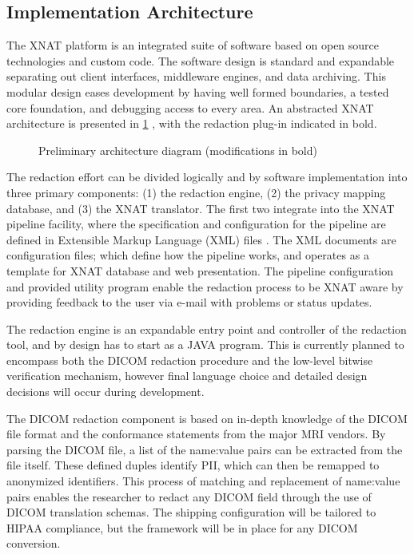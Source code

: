 \subsection*{Implementation Architecture}

The XNAT platform is an integrated suite of software based on open source technologies and custom code. The software design is standard and expandable separating out client interfaces, middleware engines, and data archiving. This modular design eases development by having well formed boundaries, a tested core foundation, and debugging access to every area. An abstracted XNAT architecture is presented in \ref{fig:architecture} \cite{xnat}, with the redaction plug-in indicated in bold.

\begin{figure}[hbt]
        \caption{\label{fig:architecture} Preliminary architecture diagram (modifications in bold)}
\end{figure}

The redaction effort can be divided logically and by software implementation into three primary components: (1) the redaction engine, (2) the privacy mapping database, and (3) the XNAT translator. The first two integrate into the XNAT pipeline facility\cite{xnatpipeline}, where the specification and configuration for the pipeline are defined in Extensible Markup Language (XML) files \cite{bray2000}. The XML documents are configuration files; which define how the pipeline works, and operates as a template for XNAT database and web presentation. The pipeline configuration and provided utility program enable the redaction process to be XNAT aware by providing feedback to the user via e-mail with problems or status updates.

The redaction engine is an expandable entry point and controller of the redaction tool, and by design has to start as a JAVA program. This is currently planned to encompass both the DICOM redaction procedure and the low-level bitwise verification mechanism, however final language choice and detailed design decisions will occur during development. 

The DICOM redaction component is based on in-depth knowledge of the DICOM file format and the conformance statements from the major MRI vendors. By parsing the DICOM file, a list of the name:value pairs can be extracted from the file itself. These defined duples identify PII, which can then be remapped to anonymized identifiers. This process of matching and replacement of name:value pairs enables the researcher to redact any DICOM field through the use of DICOM translation schemas. The shipping configuration will be tailored to HIPAA compliance, but the framework will be in place for any DICOM conversion. 

